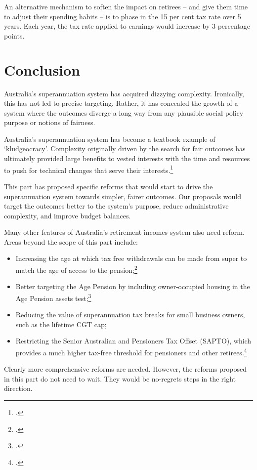 An alternative mechanism to soften the impact on retirees – and give them time to adjust their spending habits – is to phase in the 15 per cent tax rate over 5 years. Each year, the tax rate applied to earnings would increase by 3 percentage points.

\chapter{Conclusion}
\vspace{-\baselineskip}
Australia’s superannuation system has acquired dizzying complexity. Ironically, this has not led to precise targeting. Rather, it has concealed the growth of a system where the outcomes diverge a long way from any plausible social policy purpose or notions of fairness.

Australia’s superannuation system has become a textbook example of ‘kludgeocracy’. Complexity originally driven by the search for fair outcomes has ultimately provided large benefits to vested interests with the time and resources to push for technical changes that serve their interests.\footcite{Teles2013} 

This part has proposed specific reforms that would start to drive the superannuation system towards simpler, fairer outcomes. Our proposals would target the outcomes better to the system’s purpose, reduce administrative complexity, and improve budget balances.

Many other features of Australia’s retirement incomes system also need reform. Areas beyond the scope of this part include: 
\begin{itemize}
\item	Increasing the age at which tax free withdrawals can be made from super to match the age of access to the pension;\footcite[][29]{DaleyMcGannonSavageEtAl2013BalancingBudgets} 
\item	Better targeting the Age Pension by including owner-occupied housing in the Age Pension assets test;\footcite[][37]{DaleyMcGannonSavageEtAl2013BalancingBudgets} 
\item	Reducing the value of superannuation tax breaks for small business owners, such as the lifetime CGT cap; 
\item	Restricting the Senior Australian and Pensioners Tax Offset (SAPTO), which provides a much higher tax-free threshold for pensioners and other retirees.\footcite{ACOSS2015--Sub-to-Govt-Retirement-Incomes-Review} 
\end{itemize} 
Clearly more comprehensive reforms are needed. However, the reforms proposed in this part do not need to wait. They would be no-regrets steps in the right direction. 





